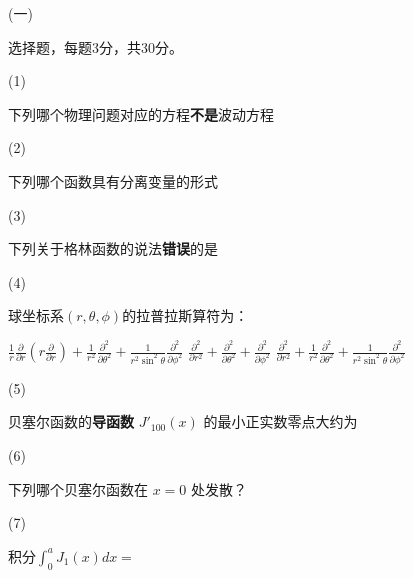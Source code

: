 \documentclass[12pt,CJK]{article}
\begin{document}
\bitem
\item[(一)]{选择题，每题3分，共30分。

  \bitem

\item[(1)]{下列哪个物理问题对应的方程{\bf 不是}波动方程 \bropt
  
  }


\item[(2)]{下列哪个函数具有分离变量的形式 \bropt
  
  }
  

\item[(3)]{下列关于格林函数的说法{\bf 错误}的是 \bropt
  
  }


\item[(4)]{球坐标系$(r,\theta,\phi)$的拉普拉斯算符为： \bropt
  
           {$\frac{1}{r}\frac{\partial}{\partial r}\left(r\frac{\partial}{\partial r}\right) + \frac{1}{r^2}\frac{\partial^2}{\partial \theta^2} + \frac{1}{r^2\sin^2\theta}\frac{\partial^2}{\partial \phi^2} $}
           {$\frac{\partial^2}{\partial r^2} + \frac{\partial^2}{\partial \theta^2} +\frac{\partial^2}{\partial \phi^2}$}
           {$\frac{\partial^2}{\partial r^2} + \frac{1}{r^2}\frac{\partial^2}{\partial \theta^2} + \frac{1}{r^2\sin^2\theta}\frac{\partial^2}{\partial \phi^2}$}
}  

\item[(5)]{贝塞尔函数的{\bf 导函数} $J'_{100}(x)$ 的最小正实数零点大约为 \bropt

  }
  
\item[(6)]{ 下列哪个贝塞尔函数在 $x=0$ 处发散？ \bropt
  
   }

\item[(7)]{ 积分$\int_0^a J_1(x) dx= $ \bropt
  
   }

}
\end{document}
